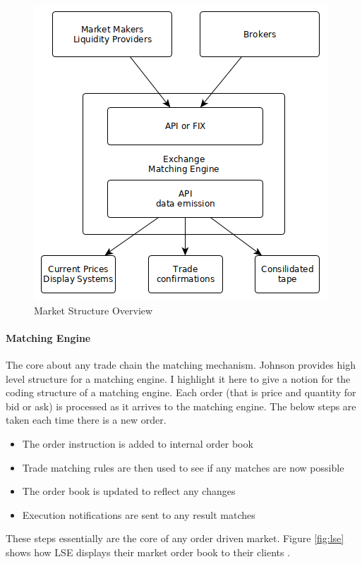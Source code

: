 \documentclass[12pt]{article}
\begin{document}
\begin{figure}[h!]
	\centering
  \includegraphics[scale=0.6]{market.png}
  \caption{Market Structure Overview}
  \label{fig:market}
\end{figure}
\FloatBarrier

\paragraph*{Matching Engine} The core about any trade chain the matching mechanism. Johnson \cite{johnson} provides high level structure for a matching engine. I highlight it here to give a notion for the coding structure of a matching engine. Each order (that is price and quantity for bid or ask) is processed as it arrives to the matching engine. The below steps are taken each time there is a new order.
\begin{itemize}
\item The order instruction is added to internal order book
\item Trade matching rules are then used to see if any matches are now possible
\item The order book is updated to reflect any changes
\item Execution notifications are sent to any result matches
\end{itemize}
These steps essentially are the core of any order driven market. Figure \ref{fig:lse} shows how LSE displays their market order book to their clients \cite{lse}.
\end{document}
